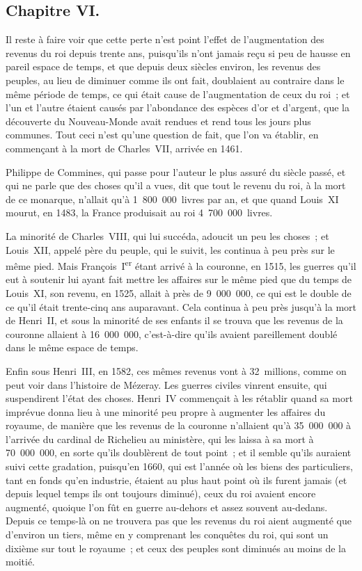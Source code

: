 \documentclass[french,twoside]{book} %
\begin{document}
\subsection[{Chapitre VI.}]{Chapitre VI.}
\noindent Il reste à faire voir que cette perte n’est point l’effet de l’augmentation des revenus du roi depuis trente ans, puisqu’ils n’ont jamais reçu si peu de hausse en pareil espace de temps, et que depuis deux siècles environ, les revenus des peuples, au lieu de diminuer comme ils ont fait, doublaient au contraire dans le même période de temps, ce qui était cause de l’augmentation de ceux du roi ; et l’un et l’autre étaient causés par l’abondance des espèces d’or et d’argent, que la découverte du Nouveau-Monde avait rendues et rend tous les jours plus communes. Tout ceci n’est qu’une question de fait, que l’on va établir, en commençant à la mort de Charles VII, arrivée en 1461.\par
Philippe de Commines, qui passe pour l’auteur le plus assuré du siècle passé, et qui ne parle que des choses qu’il a vues, dit que tout le revenu du roi, à la mort de ce monarque, n’allait qu’à 1 800 000 livres par an, et que quand Louis XI mourut, en 1483, la France produisait au roi 4 700 000 livres.\par
La minorité de Charles VIII, qui lui succéda, adoucit un peu les choses ; et Louis XII, appelé père du peuple, qui le suivit, les continua à peu près sur le même pied. Mais François I\textsuperscript{er} étant arrivé à la couronne, en 1515, les guerres qu’il eut à soutenir lui ayant fait mettre les affaires sur le même pied que du temps de Louis XI, son revenu, en 1525, allait à près de 9 000 000, ce qui est le double de ce qu’il était trente-cinq ans auparavant. Cela continua à peu près jusqu’à la mort de Henri II, et sous la minorité de ses enfants il se trouva que les revenus de la couronne allaient à 16 000 000, c’est-à-dire qu’ils avaient pareillement doublé dans le même espace de temps.\par
Enfin sous Henri III, en 1582, ces mêmes revenus vont à 32 millions, comme on peut voir dans l’histoire de Mézeray. Les guerres civiles vinrent ensuite, qui suspendirent l’état des choses. Henri IV commençait à les rétablir quand sa mort imprévue donna lieu à une minorité peu propre à augmenter les affaires du royaume, de manière que les revenus de la couronne n’allaient qu’à 35 000 000 à l’arrivée du cardinal de Richelieu au ministère, qui les laissa à sa mort à 70 000 000, en sorte qu’ils doublèrent de tout point ; et il semble qu’ils auraient suivi cette gradation, puisqu’en 1660, qui est l’année où les biens des particuliers, tant en fonds qu’en industrie, étaient au plus haut point où ils furent jamais (et depuis lequel temps ils ont toujours diminué), ceux du roi avaient encore augmenté, quoique l’on fût en guerre au-dehors et assez souvent au-dedans. Depuis ce temps-là on ne trouvera pas que les revenus du roi aient augmenté que d’environ un tiers, même en y comprenant les conquêtes du roi, qui sont un dixième sur tout le royaume ; et ceux des peuples sont diminués au moins de la moitié.
\end{document}
